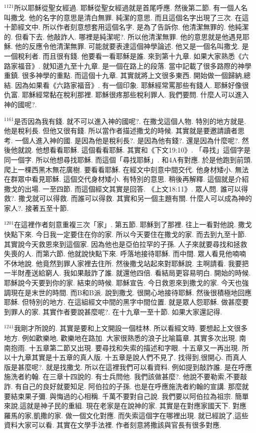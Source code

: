 \documentclass{book}
\begin{document}
$^{1121}$所以耶穌從聖女經過.
耶穌從聖女經過就是首尾呼應.
然後第二節.
有一個人名叫撒戈.
他的名字的意思是清白無罪.
純潔的意思.
而且這個名字出現了三次.
在這十節經文中.
所以作者刻意想套用這個名字.
是為了告訴你.
他清潔無罪的.
他純潔的.
但看下去.
他敲詐人.
哪裡是純潔呢?.
所以他清潔無罪.
他的意思就是他遇見耶穌.
他的反應令他清潔無罪.
可能就要表達這個神學論述.
他又是一個名叫撒戈.
是一個稅利者.
而且很有錢.
他要看一看耶穌是誰.
來到第十九章.
如果大家熟悉《六路家福音》.
就知道九至十九章.
是一個在路上的段落.
當中記載了很多路際的神學重鎮.
很多神學的重點.
而這個十九章.
其實就將上文很多東西.
開始做一個歸納,總結.
因為如果看《六路家福音》.
有一個印象.
耶穌經常罵那些有錢人.
耶穌好像很仇富.
耶穌經常黏在稅利那裡.
耶穌很疼那些稅利罪人.
我們要問.
什麼人可以進入神的國呢?.

$^{1161}$是否因為我有錢.
就不可以進入神的國呢?.
在撒戈這個人物.
特別的地方就是.
他是稅利長.
但他又很有錢.
所以當作者描述撒戈的時候.
其實就是要邀請讀者思考.
一個人進入神的國.
是因為他是稅利長?.
是因為他有錢?.
還是因為什麼呢?.
然後他就說.
他想看看耶穌.
這個看看耶穌.
其實和《下文19:10》.
「尋找」這個字是同一個字.
所以他想尋找耶穌.
而這個「尋找耶穌」.
和4A有對應.
於是他跑到前頭.
爬上一棵西黑木無花廣樹.
要看看耶穌.
在經文中刻意中間交代.
他身材矮小.
無法在群眾中看見耶穌.
這個交代身材矮小.
有特別的意思.
稍後再解釋.
這個就是介紹撒戈的出場.
一至四節.
而這個經文其實是回答.
《上文18:11》.
眾人問.
誰可以得救?.
撒戈就可以得救.
而誰可以得救.
其實和另一個主題有關.
什麼人可以成為神的家人?.
接著五至十節.

$^{1201}$在這裡作者刻意重複三次「家」.
第五節.
耶穌到了那裡.
往上一看對他說.
撒戈快點下來.
今日我一定要住在你的家.
所以今天要住在撒戈的家.
而去到九至十節.
其實說今天救恩來到這個家.
因為他也是亞伯拉罕的子孫.
人子來就要尋找和拯救失喪的人.
而第六節.
他就說快點下來.
呼落地接待耶穌.
而中間.
眾人看見他喃喃不休地說.
他竟然到罪人家裡去住所.
然後撒戈站起來對耶穌說.
主啊請看.
我要把一半財產送給窮人.
我如果敲詐了誰.
就還他四倍.
看結局更容易明白.
開始的時候.
耶穌說今天要到你的家.
結束的時候.
耶穌宣告.
今日救恩來到撒戈的家.
今天也強調現在是末世的時間.
而B和B派.
說到撒戈.
很開心地接待耶穌.
然後很積極地回應耶穌.
但特別的地方.
在這組經文中間的黑字中間位置.
就是眾人怨耶穌.
做甚麼要到罪人的家.
其實作者要說甚麼呢?.
在十九章一至十節.
如果大家還記得.

$^{1241}$我剛才所說的.
其實是要和上文開設一個桂林.
所以看經文時.
要想起上文很多地方.
例如歡樂地.
歡樂地在路加.
大家很熟悉的浪子比喻篇章.
其實多次出現.
南南抱雨.
十五章第二節又出現.
要尋找和失索的描述和字眼.
十五章又一再出現.
所以十九章其實是十五章的真人版.
十五章是說人們不見了.
找得到,很開心.
而真人版是甚麼呢?.
就是找撒戈.
所以在這裡我們可以看資料.
例如提到敲詐誰.
是在呼應施洗者約翰.
在三章十四說的.
有士兵問他.
我們該做甚麼?.
他說不要勒索,不要敲詐.
有自己的良好就要知足.
阿伯拉的子孫.
也是在呼應施洗者約翰的宣講.
那麼就要結束果子彌.
與悔過的心相稱.
千萬不要對自己說.
我們要以阿伯拉為祖宗.
簡單來說,這就是神子民的重組.
現在老家是在說神的家.
其實是在對應家國天下.
對應羅馬的家,凱撒的家.
做一個文化對應.
而失索這個字在哪裡出現.
就已經說了,這些資料大家可以看.
其實在文學手法裡.
作者刻意將撒該與官長有很多對應.
\end{document}
